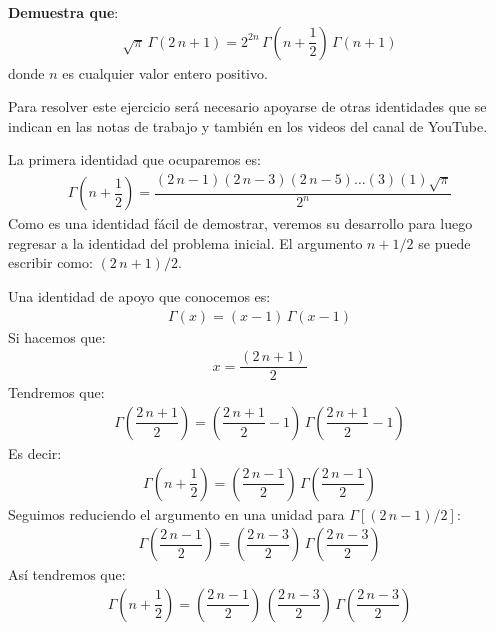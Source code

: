 \textbf{Demuestra que}:
\begin{align*}
\sqrt{\pi} \, \Gamma(2 \, n + 1) = 2^{2n} \, \Gamma \left( n + \dfrac{1}{2} \right) \, \Gamma(n + 1)
\end{align*}
donde $n$ es cualquier valor entero positivo.
\par
Para resolver este ejercicio será necesario apoyarse de otras identidades que se indican en las notas de trabajo y también en los videos del canal de YouTube.
\par
La primera identidad que ocuparemos es:
\begin{align*}
\Gamma\left( n + \dfrac{1}{2} \right) = \dfrac{(2 \, n {-} 1)(2 \, n {-} 3)(2 \, n {-} 5) \ldots (3)(1)\sqrt{\pi}}{2^{n}}
\end{align*}
Como es una identidad fácil de demostrar, veremos su desarrollo para luego regresar a la identidad del problema inicial. El argumento $n + 1/2$ se puede escribir como: $(2 \, n + 1)/2$.
\par
Una identidad de apoyo que conocemos es:
\begin{align*}
\Gamma(x) = (x - 1) \, \Gamma (x - 1)
\end{align*}
Si hacemos que:
\begin{align*}
x = \dfrac{(2 \, n + 1)}{2}
\end{align*}
Tendremos que:
\begin{align*}
\Gamma \left( \dfrac{2 \, n + 1}{2} \right) = \left( \dfrac{2 \, n + 1}{2} - 1 \right) \, \Gamma \left( \dfrac{2 \, n + 1}{2} - 1 \right)
\end{align*}
Es decir:
\begin{align*}
\Gamma \left( n + \dfrac{1}{2} \right) = \left( \dfrac{2 \, n - 1}{2} \right) \, \Gamma \left( \dfrac{2 \, n - 1}{2} \right)
\end{align*}
Seguimos reduciendo el argumento en una unidad para $\Gamma [(2 \, n - 1)/2]$:
\begin{align*}
\Gamma \left( \dfrac{2 \, n - 1}{2} \right) = \left( \dfrac{2 \, n - 3}{2} \right) \, \Gamma \left( \dfrac{2 \, n - 3}{2} \right)
\end{align*}
Así tendremos que:
\begin{align*}
\Gamma \left( n + \dfrac{1}{2} \right) = \left( \dfrac{2 \, n - 1}{2} \right) \, \left( \dfrac{2 \, n - 3}{2} \right) \, \Gamma \left( \dfrac{2 \, n - 3}{2} \right)
\end{align*}

